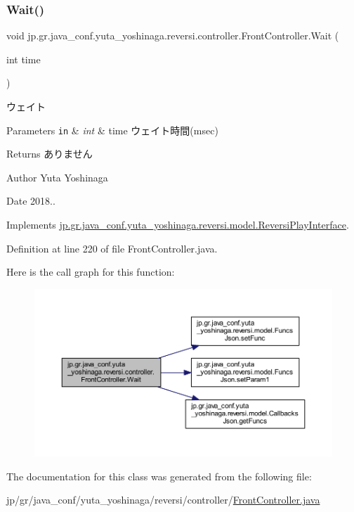 \subsubsection{\texorpdfstring{Wait()}{Wait()}}
{\footnotesize\ttfamily void jp.\+gr.\+java\+\_\+conf.\+yuta\+\_\+yoshinaga.\+reversi.\+controller.\+Front\+Controller.\+Wait (\begin{DoxyParamCaption}\item[{int}]{time }\end{DoxyParamCaption})}



ウェイト 


\begin{DoxyParams}[1]{Parameters}
\mbox{\tt in}  & {\em int} & time ウェイト時間(msec) \\
\hline
\end{DoxyParams}
\begin{DoxyReturn}{Returns}
ありません 
\end{DoxyReturn}
\begin{DoxyAuthor}{Author}
Yuta Yoshinaga 
\end{DoxyAuthor}
\begin{DoxyDate}{Date}
2018.. 
\end{DoxyDate}


Implements \mbox{\hyperlink{interfacejp_1_1gr_1_1java__conf_1_1yuta__yoshinaga_1_1reversi_1_1model_1_1_reversi_play_interface}{jp.\+gr.\+java\+\_\+conf.\+yuta\+\_\+yoshinaga.\+reversi.\+model.\+Reversi\+Play\+Interface}}.



Definition at line 220 of file Front\+Controller.\+java.

Here is the call graph for this function\+:
\nopagebreak
\begin{figure}[H]
\begin{center}
\leavevmode
\includegraphics[width=350pt]{classjp_1_1gr_1_1java__conf_1_1yuta__yoshinaga_1_1reversi_1_1controller_1_1_front_controller_af513d1ccfca9fc00f93fb650f1f08b05_cgraph}
\end{center}
\end{figure}


The documentation for this class was generated from the following file\+:\begin{DoxyCompactItemize}
\item 
jp/gr/java\+\_\+conf/yuta\+\_\+yoshinaga/reversi/controller/\mbox{\hyperlink{_front_controller_8java}{Front\+Controller.\+java}}\end{DoxyCompactItemize}
